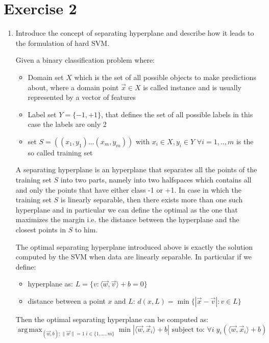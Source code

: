 \documentclass[a4paper,11pt,oneside]{book}
\DeclareMathOperator*{\argmax}{arg\,max}
\begin{document}
\section{Exercise 2}
\begin{enumerate}
\item Introduce the concept of separating hyperplane and describe how it leads to the formulation of hard SVM.
    \begin{solution}
        Given a binary classification problem where:
        \begin{itemize}
        \item Domain set $X$ which is the set of all possible objects to make predictions about, where a domain point $\vec{x} \in X$ is called instance and is usually represented by a vector of features
        \item Label set $Y = \{-1,+1\}$, that defines the set of all possible labels in this case the labels are only 2
        \item set $S = ((x_1, y_1) ... (x_m, y_m))$ with $x_i \in X, y_i \in Y$ $\forall i = 1,..,m$ is the so called training set
        \end{itemize}
        
        A separating hyperplane is an hyperplane that separates all the points of the training set $S$ into two parts, namely into two halfspaces which contains all and only the points that have either class -1 or +1.
        In case in which the training set $S$ is linearly separable, then there exists more than one such hyperplane and in particular we can define the optimal as the one that maximizes the margin i.e. the distance between the hyperplane and the closest points in $S$ to him.
        
        The optimal separating hyperplane introduced above is exactly the solution computed by the SVM when data are linearly separable. In particular if we define:
        \begin{itemize}
        \item hyperplane as: $L = \{v :\langle \vec{w}, \vec{v} \rangle +b = 0\}$
        \item distance between a point $x$ and $L$: $d(x,L) = \min \{|\vec{x} - \vec{v}|: v \in L\}$
        \end{itemize}
        
        Then the optimal separating hyperplane can be computed as:
        $$\argmax_{(\vec{w},b): \|\vec{w}\|=1 \; i\in\{1,...,m\}} \min |\langle \vec{w},\vec{x}_i \rangle +b| \text{ subject to: } \forall i \; y_i(\langle \vec{w},\vec{x}_i \rangle +b)$$
        

\end{solution}
\end{enumerate}
\end{document}
